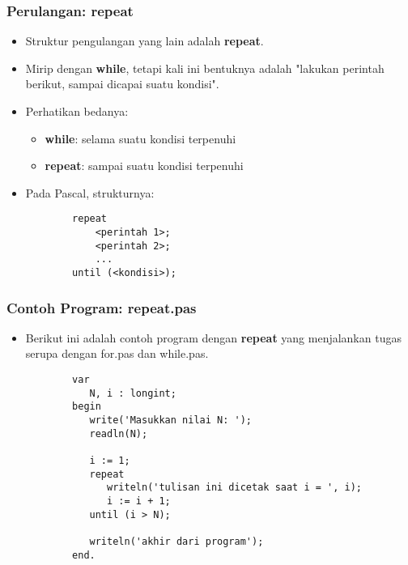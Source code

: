 \documentclass{beamer}
\begin{document}
\begin{frame}[fragile]
\frametitle{Perulangan: repeat}
\begin{itemize}
	\item Struktur pengulangan yang lain adalah \textbf{repeat}.
	\item Mirip dengan \textbf{while}, tetapi kali ini bentuknya adalah "lakukan perintah berikut, sampai dicapai suatu kondisi".
	\item Perhatikan bedanya:
	\begin{itemize}
		\item \textbf{while}: selama suatu kondisi terpenuhi
		\item \textbf{repeat}: sampai suatu kondisi terpenuhi
	\end{itemize}
	\item Pada Pascal, strukturnya:
	\begin{lstlisting}
		repeat
		    <perintah 1>;
		    <perintah 2>;
		    ...
		until (<kondisi>);
	\end{lstlisting}
\end{itemize}
\end{frame}

\begin{frame}[fragile]
\frametitle{Contoh Program: repeat.pas}
\begin{itemize}
	\item Berikut ini adalah contoh program dengan \textbf{repeat} yang menjalankan tugas serupa dengan for.pas dan while.pas.
	\begin{lstlisting}
		var
		   N, i : longint;
		begin
		   write('Masukkan nilai N: ');
		   readln(N);
		
		   i := 1;
		   repeat
		      writeln('tulisan ini dicetak saat i = ', i);
		      i := i + 1;
		   until (i > N);
		
		   writeln('akhir dari program');
		end.
	\end{lstlisting}
\end{itemize}
\end{frame}
\end{document}
